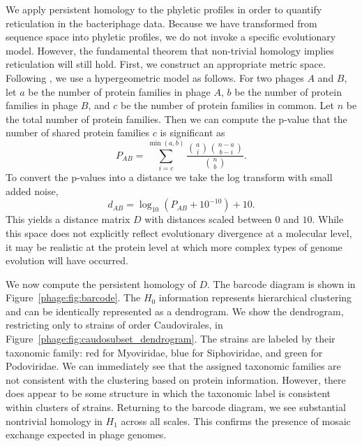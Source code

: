 We apply persistent homology to the phyletic profiles in order to quantify reticulation in the bacteriphage data.
Because we have transformed from sequence space into phyletic profiles, we do not invoke a specific evolutionary model.
However, the fundamental theorem that non-trivial homology implies reticulation will still hold.
First, we construct an appropriate metric space.
Following \cite{LimaMendez:2008ki}, we use a hypergeometric model as follows.
For two phages $A$ and $B$, let $a$ be the number of protein families in phage $A$, $b$ be the number of protein families in phage $B$, and $c$ be the number of protein families in common.
Let $n$ be the total number of protein families.
Then we can compute the p-value that the number of shared protein families $c$ is significant as
\begin{equation}
P_{AB} = \sum_{i=c}^{\min(a,b)} \frac{\binom{a}{i}\binom{n-a}{b-i}}{\binom{n}{b}}.
\end{equation}
To convert the p-values into a distance we take the log transform with small added noise,
\begin{equation}
d_{AB} = \log_{10}(P_{AB} + 10^{-10}) + 10.
\end{equation}
This yields a distance matrix $D$ with distances scaled between $0$ and $10$.
While this space does not explicitly reflect evolutionary divergence at a molecular level, it may be realistic at the protein level at which more complex types of genome evolution will have occurred.

We now compute the persistent homology of $D$.
The barcode diagram is shown in Figure~\ref{phage:fig:barcode}.
The $H_0$ information represents hierarchical clustering and can be identically represented as a dendrogram.
We show the dendrogram, restricting only to strains of order Caudovirales, in Figure~\ref{phage:fig:caudosubset_dendrogram}.
The strains are labeled by their taxonomic family: red for Myoviridae, blue for Siphoviridae, and green for Podoviridae.
We can immediately see that the assigned taxonomic families are not consistent with the clustering based on protein information.
However, there does appear to be some structure in which the taxonomic label is consistent within clusters of strains.
Returning to the barcode diagram, we see substantial nontrivial homology in $H_1$ across all scales.
This confirms the presence of mosaic exchange expected in phage genomes.


